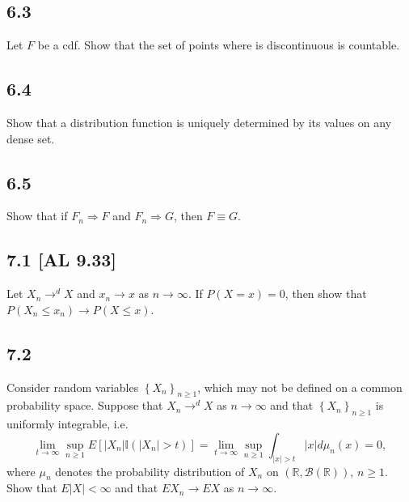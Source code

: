 \documentclass[12pt]{article}
\begin{document}
\subsection*{6.3}
\begin{tcolorbox}
Let $F$ be a cdf. Show that the set of points where is discontinuous is countable.
\end{tcolorbox}



\subsection*{6.4}
\begin{tcolorbox}
Show that a distribution function is uniquely determined by its values on any dense set.
\end{tcolorbox}


\subsection*{6.5}
\begin{tcolorbox}
Show that if $F_{n} \Rightarrow F$ and $F_{n}\Rightarrow G$, then $F \equiv G$.
\end{tcolorbox}





\subsection*{7.1 [AL 9.33]}
\begin{tcolorbox}
Let $X_{n} \rightarrow^{d} X$ and $x_{n} \rightarrow x$ as $n\rightarrow\infty$. If $P(X = x) = 0$, then show that $P(X_{n}\leq x_{n}) \rightarrow P(X
\leq x)$.
\end{tcolorbox}

\subsection*{7.2}
\begin{tcolorbox}
Consider random variables $\left\{ X_{n} \right\}_{n\geq 1}$, which may not be defined on a common probability space. Suppose that $X_{n}
\rightarrow^{d} X$ as $n \rightarrow \infty$ and that $\left\{ X_{n} \right\}_{n\geq 1}$ is uniformly integrable, i.e.
\[ \lim_{t\rightarrow\infty}\sup_{n\geq 1}E\left[ |X_{n}|\mathbb{I}(|X_{n}| > t) \right] = \lim_{t\rightarrow\infty}\sup_{n\geq 1}\int_{|x| >
t}|x|d\mu_{n}(x) = 0, \]
where $\mu_{n}$ denotes the probability distribution of $X_n$ on $(\mathbb{R}, \mathcal{B}(\mathbb{R}))$, $n\geq 1$. Show that $E|X| < \infty$ and
that $EX_n \rightarrow EX$ as $n\rightarrow\infty$.
\end{tcolorbox}
\end{document}
